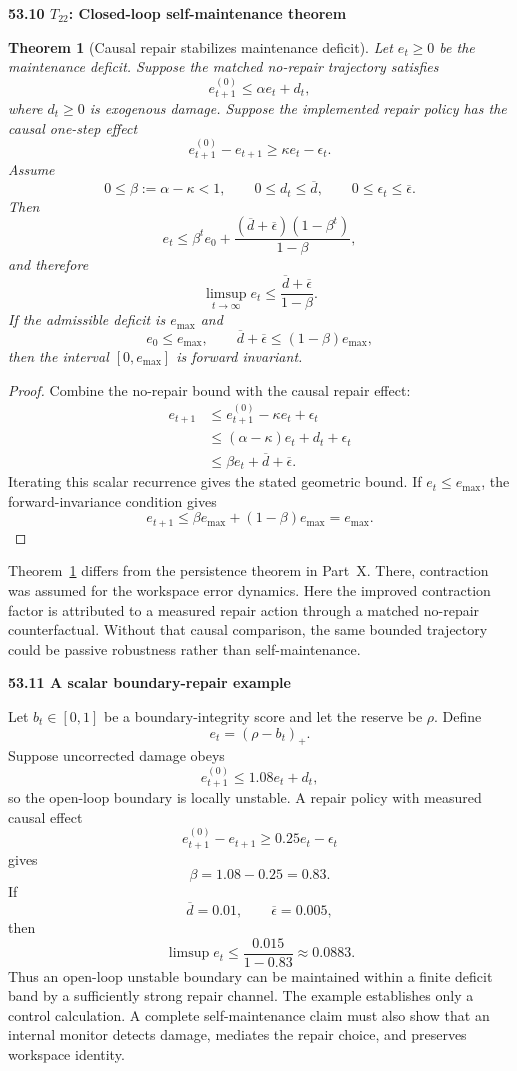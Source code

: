 \documentclass[11pt,letterpaper]{article}
\newcommand{\subtopic}[1]{%
 \vspace{0.45em}
 {\bfseries\color{AccentColor} #1\par}
}
\theoremstyle{plain}
\newtheorem{theorem}{Theorem}
\theoremstyle{definition}
\begin{document}
\subtopic{53.10 \(T_{22}\): Closed-loop self-maintenance theorem }

\begin{theorem}[Causal repair stabilizes maintenance deficit]
\label{thm:self-maintenance}
Let \(e_t\geq0\) be the maintenance deficit. Suppose the matched no-repair
trajectory satisfies
\[
e_{t+1}^{(0)}
\leq
\alpha e_t+d_t,
\]
where \(d_t\geq0\) is exogenous damage. Suppose the implemented repair policy
has the causal one-step effect
\[
e_{t+1}^{(0)}-e_{t+1}
\geq
\kappa e_t-\epsilon_t.
\]
Assume
\[
0\leq\beta:=\alpha-\kappa<1,
\qquad
0\leq d_t\leq\overline d,
\qquad
0\leq\epsilon_t\leq\overline\epsilon.
\]
Then
\[
\boxed{
e_t
\leq
\beta^te_0
+
\frac{(\overline d+\overline\epsilon)(1-\beta^t)}{1-\beta},
}
\]
and therefore
\[
\boxed{
\limsup_{t\to\infty}e_t
\leq
\frac{\overline d+\overline\epsilon}{1-\beta}.
}
\]
If the admissible deficit is \(e_{\max}\) and
\[
e_0\leq e_{\max},
\qquad
\overline d+\overline\epsilon
\leq
(1-\beta)e_{\max},
\]
then the interval \([0,e_{\max}]\) is forward invariant.
\end{theorem}

\begin{proof}
Combine the no-repair bound with the causal repair effect:
\[
\begin{aligned}
e_{t+1}
&\leq
 e_{t+1}^{(0)}-\kappa e_t+\epsilon_t\\
&\leq
(\alpha-\kappa)e_t+d_t+\epsilon_t\\
&\leq
\beta e_t+\overline d+\overline\epsilon.
\end{aligned}
\]
Iterating this scalar recurrence gives the stated geometric bound. If
\(e_t\leq e_{\max}\), the forward-invariance condition gives
\[
e_{t+1}
\leq
\beta e_{\max}
+(1-\beta)e_{\max}
=e_{\max}.
\]
\end{proof}

Theorem~\ref{thm:self-maintenance} differs from the persistence theorem in
Part~X. There, contraction was assumed for the workspace error dynamics. Here
the improved contraction factor is attributed to a measured repair action
through a matched no-repair counterfactual. Without that causal comparison,
the same bounded trajectory could be passive robustness rather than
self-maintenance.

\subtopic{53.11 A scalar boundary-repair example}

Let \(b_t\in[0,1]\) be a boundary-integrity score and let the reserve be
\(\rho\). Define
\[
e_t=(\rho-b_t)_+.
\]
Suppose uncorrected damage obeys
\[
e_{t+1}^{(0)}
\leq
1.08e_t+d_t,
\]
so the open-loop boundary is locally unstable. A repair policy with measured
causal effect
\[
e_{t+1}^{(0)}-e_{t+1}
\geq
0.25e_t-\epsilon_t
\]
gives
\[
\beta=1.08-0.25=0.83.
\]
If
\[
\overline d=0.01,
\qquad
\overline\epsilon=0.005,
\]
then
\[
\limsup e_t
\leq
\frac{0.015}{1-0.83}
\approx0.0883.
\]
Thus an open-loop unstable boundary can be maintained within a finite deficit
band by a sufficiently strong repair channel. The example establishes only a
control calculation. A complete self-maintenance claim must also show that an
internal monitor detects damage, mediates the repair choice, and preserves
workspace identity.
\end{document}
